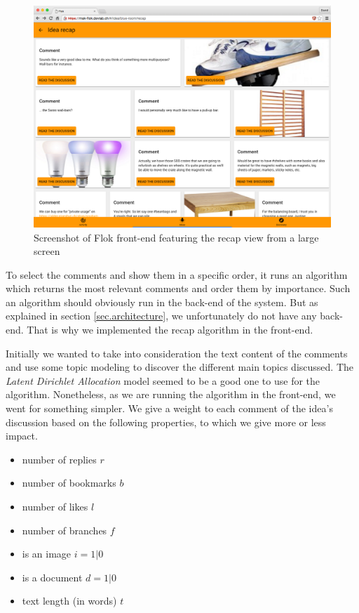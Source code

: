 \documentclass[a4paper,12pt, oneside]{article}
\begin{document}
\begin{figure}[!htb]
    \centering
    \includegraphics[width=\textwidth]{images/recapDesktop.png}
    \caption{Screenshot of Flok front-end featuring the recap view from a large screen}
    \label{fig.recap.desktop}
\end{figure}

To select the comments and show them in a specific order, it runs an algorithm which returns the most relevant comments and order them by importance.
Such an algorithm should obviously run in the back-end of the system.
But as explained in section \ref{sec.architecture}, we unfortunately do not have any back-end.
That is why we implemented the recap algorithm in the front-end.

Initially we wanted to take into consideration the text content of the comments and use some topic modeling to discover the different main topics discussed.
The \emph{Latent Dirichlet Allocation} \cite{blei2003latent} model seemed to be a good one to use for the algorithm.
Nonetheless, as we are running the algorithm in the front-end, we went for something simpler.
We give a weight to each comment of the idea's discussion based on the following properties, to which we give more or less impact.

\begin{multicols}{2}
    \begin{itemize}
        \item number of replies $r$
        \item number of bookmarks $b$
        \item number of likes $l$
        \item number of branches $f$
        \item is an image $i = 1 | 0$
        \item is a document $d = 1 | 0$
        \item text length (in words) $t$
    \end{itemize}
\end{multicols}
\end{document}
